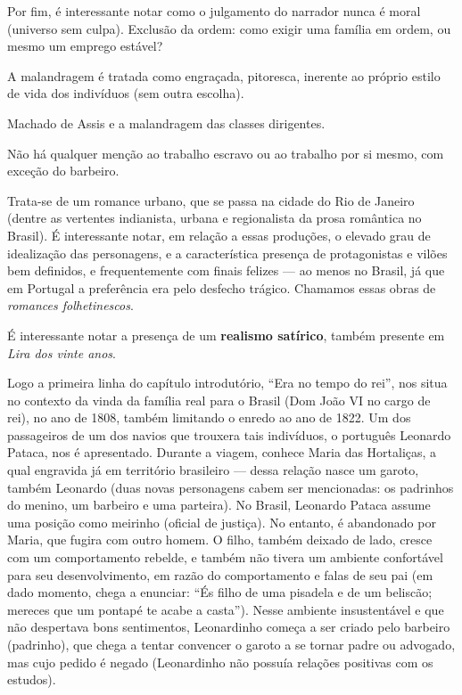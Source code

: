 Por fim, é interessante notar como o julgamento do narrador nunca é moral (universo sem culpa). Exclusão da ordem: como exigir uma família em ordem, ou mesmo um emprego estável?

A malandragem é tratada como engraçada, pitoresca, inerente ao próprio estilo de vida dos indivíduos (sem outra escolha).

Machado de Assis e a malandragem das classes dirigentes.

Não há qualquer menção ao trabalho escravo ou ao trabalho por si mesmo, com exceção do barbeiro.

Trata-se de um romance urbano, que se passa na cidade do Rio de Janeiro (dentre as vertentes indianista, urbana e regionalista da prosa romântica no Brasil). É interessante notar, em relação a essas produções, o elevado grau de idealização das personagens, e a característica presença de protagonistas e vilões bem definidos, e frequentemente com finais felizes — ao menos no Brasil, já que em Portugal a preferência era pelo desfecho trágico. Chamamos essas obras de \textit{romances folhetinescos}.

É interessante notar a presença de um \textbf{realismo satírico}, também presente em \textit{Lira dos vinte anos}.

Logo a primeira linha do capítulo introdutório, ``Era no tempo do rei'', nos situa no contexto da vinda da família real para o Brasil (Dom João VI no cargo de rei), no ano de 1808, também limitando o enredo ao ano de 1822. Um dos passageiros de um dos navios que trouxera tais indivíduos, o português Leonardo Pataca, nos é apresentado. Durante a viagem, conhece Maria das Hortaliças, a qual engravida já em território brasileiro — dessa relação nasce um garoto, também Leonardo (duas novas personagens cabem ser mencionadas: os padrinhos do menino, um barbeiro e uma parteira). No Brasil, Leonardo Pataca assume uma posição como meirinho (oficial de justiça). No entanto, é abandonado por Maria, que fugira com outro homem. O filho, também deixado de lado, cresce com um comportamento rebelde, e também não tivera um ambiente confortável para seu desenvolvimento, em razão do comportamento e falas de seu pai (em dado momento, chega a enunciar: ``És filho de uma pisadela e de um beliscão; mereces que um pontapé te acabe a casta''). Nesse ambiente insustentável e que não despertava bons sentimentos, Leonardinho começa a ser criado pelo barbeiro (padrinho), que chega a tentar convencer o garoto a se tornar padre ou advogado, mas cujo pedido é negado (Leonardinho não possuía relações positivas com os estudos).

